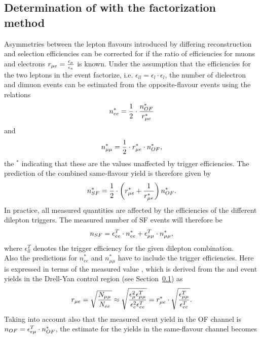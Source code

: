 

\subsection{Determination of \Rsfof with the factorization method}
\label{sec:rmue}
Asymmetries between the lepton flavours introduced by differing reconstruction and selection efficiencies can be corrected for if the ratio of efficiencies for muons and electrons $r_{\mu e} = \frac{\epsilon_{\mu}}{\epsilon_{e}}$ is known. Under the assumption that the efficiencies for the two leptons in the event factorize, i.e. $\epsilon_{ll} = \epsilon_{l}\cdot\epsilon_{l}$, the number of dielectron and dimuon events can be estimated from the opposite-flavour events using the relations
\begin{equation}
n_{ee}^{*} = \frac{1}{2}\cdot \frac{n_{OF}^{*}}{r_{\mu e}^{*}}
\end{equation}
and 
\begin{equation}
n_{\mu\mu}^{*} = \frac{1}{2} \cdot r_{\mu e}^{*} \cdot n_{OF}^{*},
\end{equation}
the $^{*}$ indicating that these are the values unaffected by trigger efficiencies.
The prediction of the combined same-flavour yield is therefore given by
\begin{equation}
n_{SF}^{*} = \frac{1}{2}\cdot \left( r_{\mu e}^{*} + \frac{1}{r_{\mu e}^{*}} \right) n_{OF}^{*}.
\end{equation}
In practice, all measured quantities are affected by the efficiencies of the different dilepton triggers. The measured number of SF events will therefore be
\begin{equation}
n_{SF} = \epsilon_{ee}^T \cdot n_{ee}^{*} + \epsilon_{\mu\mu}^T \cdot n_{\mu\mu}^{*},
\end{equation}
where $\epsilon_{ll}^T$ denotes the trigger efficiency for the given dilepton combination.\\
Also the predictions for $n_{ee}^{*}$ and $n_{\mu\mu}^{*}$ have to include the trigger efficiencies. Here \rmuestar is expressed in terms of the measured value \rmue, which is derived from the \EE and \MM event yields in the Drell-Yan control region (see Section~\ref{sec:rmue}) as 
\begin{equation}
r_{\mu e}  = \sqrt{\frac{N_{\mu\mu}}{N_{ee}}} \approx \sqrt{\frac{\epsilon_{\mu}^2 \epsilon_{\mu\mu}^T}{\epsilon_{e}^2 \epsilon_{ee}^T}} = r_{\mu e}^{*} \cdot \sqrt{\frac{\epsilon_{\mu\mu}^T}{\epsilon_{ee}^T}}.
\end{equation}
Taking into account also that the measured event yield in the OF channel is $n_{OF} = \epsilon_{e\mu}^T \cdot n_{OF}^{*}$, the estimate for the yields in the same-flavour channel becomes
